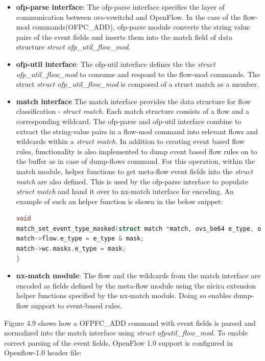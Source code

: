 \begin{itemize}
\item \textbf{ofp-parse interface}: The ofp-parse interface specifies the layer of communication between ovs-vswitchd and OpenFlow. In the case of the flow-mod commands(OFPC_ADD), ofp-parse module converts the string value pairs of the event fields and inserts them into the match field of data structure \textit{struct ofp_util_flow_mod}.
\item \textbf{ofp-util interface}: The ofp-util interface defines the the \textit{struct ofp_util_flow_mod} to consume and respond to the flow-mod commands. The struct \textit{struct ofp_util_flow_mod} is composed of a struct match as a member. 
\item \textbf{match interface} The match interface provides the data structure for flow classification - \textit{struct match}. Each match structure consists of a flow and a corresponding wildcard.  The ofp-parse and ofp-util interface combine to extract the string-value pairs in a flow-mod command into relevant flows and wildcards within a \textit{struct match}. 
In addition to creating event based flow rules, functionality is also implemented to dump event based flow rules on to the buffer as in case of dump-flows command. For this operation, within the match module, helper functions to get meta-flow event fields into the \textit{struct match} are also defined. This is used by the ofp-parse interface to populate \textit{struct match} and hand it over to nx-match interface for encoding. An example of such an helper function is shown in the below snippet: \newline
\begin{lstlisting}[language=c]
void
match_set_event_type_masked(struct match *match, ovs_be64 e_type, ovs_be64 mask){
match->flow.e_type = e_type & mask;
match->wc.masks.e_type = mask;
}
\end{lstlisting}

\item \textbf{nx-match module}: The flow and the wildcards from the match interface are encoded as fields defined by the meta-flow module using the nicira extension helper functions specified by the nx-match module. Doing so enables dump-flow support to event-based rules.
\end{itemize}

Figure 4.9 shows how a OFPFC_ADD command with event fields is parsed and normalized into the match interface using \textit{struct ofputil_flow_mod}. To enable correct parsing of the event fields, OpenFlow 1.0 support is configured in Openflow-1.0 header file: \newline

